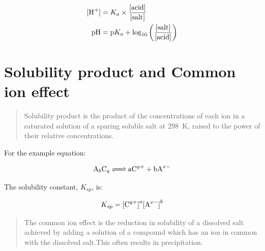\documentclass{scrbook}
\begin{document}
	\begin{align*}
		\ce{[H+]} &= K_a \times \frac{\text{[acid]}}{\text{[salt]}} \\
		\text{pH} &= \text{p}K_a + \log_{10}\left(\frac{\text{[salt]}}{\text{[acid]}}\right)
	\end{align*}

\section{Solubility product and Common ion effect}

	\begin{quote}
		Solubility product is the product of the concentrations of each ion in a saturated solution of a sparing soluble salt at \SI{298}{\kelvin}, raised to the power of their relative concentrations.
	\end{quote}

	For the example equation:

	\[ \ce{A_bC_q <=> aC^{y+} + bA^{x-}} \]

	The solubility constant, $K_{sp}$, is:

	\[ K_{sp} = \ce{[C^{y+}]}^a\ce{[A^{x-}]}^b \]

	\begin{quote}
		The common ion effect is the reduction in solubility of a dissolved salt achieved by adding a solution of a compound which has an ion in common with the dissolved salt.This often results in precipitation.
	\end{quote}

\printbibliography{}
\end{document}
